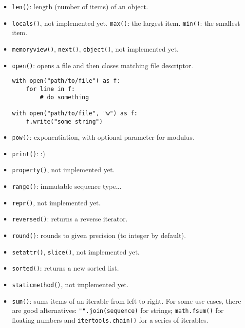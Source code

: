 \begin{itemize}
\item \texttt{len()}: length (number of items) of an object.

\item
\texttt{locals()},
\dotfill not implemented yet.
\texttt{max()}: the largest item.
\texttt{min()}: the smallest item.

\item
\texttt{memoryview()},
\texttt{next()},
\texttt{object()},
\dotfill not implemented yet.

\item \texttt{open()}: opens a file and then closes matching file descriptor.
\begin{verbatim}
with open("path/to/file") as f:
	for line in f:
		# do something

with open("path/to/file", "w") as f:
	f.write("some string")
\end{verbatim}

\item \texttt{pow()}: exponentiation, with optional parameter for modulus.

\item \texttt{print()}: :)

\item
\texttt{property()},
\dotfill not implemented yet.

\item \texttt{range()}: immutable sequence type...

\item
\texttt{repr()},
\dotfill not implemented yet.

\item \texttt{reversed()}: returns a reverse iterator.

\item \texttt{round()}: rounds to given precision (to integer by default).

\item
\texttt{setattr()},
\texttt{slice()},
\dotfill not implemented yet.

\item \texttt{sorted()}: returns a new sorted list.

\item
\texttt{staticmethod()},
\dotfill not implemented yet.

\item \texttt{sum()}: sums items of an iterable from left to right.
For some use cases, there are good alternatives: \texttt{"".join(sequence)} for strings; \texttt{math.fsum()} for floating numbers and \texttt{itertools.chain()} for a series of iterables.


\end{itemize}
